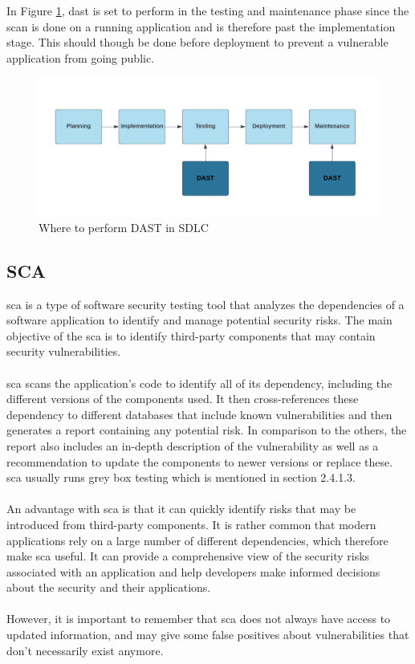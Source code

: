 \\~\\
In Figure \ref{fig: Where to perform DAST in SDLC}, \acrshort{dast} is set to perform in the testing and maintenance phase since the scan is done on a running application and is therefore past the implementation stage. This should though be done before deployment to prevent a vulnerable application from going public. 
\vspace{2mm}
\begin{figure}[H]
    \centering
    \includegraphics[width=0.8\columnwidth]{Images/dast.png}
    \caption{Where to perform DAST in SDLC} 
    \label{fig: Where to perform DAST in SDLC}
\end{figure}

\subsection{SCA}
\acrlong{sca} is a type of software security testing tool that analyzes the dependencies of a software application to identify and manage potential security risks. The main objective of the \acrshort{sca} is to identify third-party components that may contain security vulnerabilities. \cite{sca}
\\~\\
\acrshort{sca} scans the application's code to identify all of its \gls{dependency}, including the different versions of the components used. It then cross-references these \gls{dependency} to different databases that include known vulnerabilities and then generates a report containing any potential risk. In comparison to the others, the report also includes an in-depth description of the vulnerability as well as a recommendation to update the components to newer versions or replace these. \acrshort{sca} usually runs grey box testing  which is mentioned in section 2.4.1.3. 
\\~\\
An advantage with \acrshort{sca} is that it can quickly identify risks that may be introduced from third-party components. It is rather common that modern applications rely on a large number of different dependencies, which therefore make \acrshort{sca} useful. It can provide a comprehensive view of the security risks associated with an application and help developers make informed decisions about the security and their applications. 
\\~\\
However, it is important to remember that \acrshort{sca} does not always have access to updated information, and may give some false positives about vulnerabilities that don't necessarily exist anymore. 


